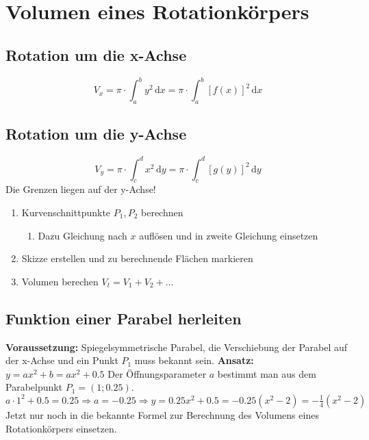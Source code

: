 
\section{Volumen eines Rotationkörpers} %
\label{sec:volumen_eines_rotationkörpers}
\subsection{Rotation um die x-Achse} %
\label{sub:rotation_um_die_x_achse}
\[ V_x = \pi \cdot \int_a^b y^2\,\mathrm{d}x = \pi \cdot \int_a^b [f(x)]^2\,\mathrm{d}x \]
\subsection{Rotation um die y-Achse} %
\label{sub:rotation_um_die_y_achse}
\[ V_y = \pi \cdot \int_c^d x^2\,\mathrm{d}y = \pi \cdot \int_c^d [g(y)]^2\,\mathrm{d}y \]
Die Grenzen liegen auf der y-Achse! 
\begin{enumerate}
	\item Kurvenschnittpunkte \(P_1, P_2\) berechnen
	\begin{enumerate}
		\item Dazu Gleichung nach \(x\) auflösen und in zweite Gleichung einsetzen
	\end{enumerate}
	\item Skizze erstellen und zu berechnende Flächen markieren
	\item Volumen berechen \(V_t = V_1 + V_2 + ... \)
\end{enumerate}
\subsection{Funktion einer Parabel herleiten} %
\label{sub:funktion_einer_parabel_herleiten}
\textbf{Voraussetzung:} Spiegelsymmetrische Parabel, die Verschiebung der Parabel auf der x-Achse und ein Punkt \(P_1\) muss bekannt sein.\newline
\textbf{Ansatz:} \(y = ax^2 + b = ax^2 + 0.5\)\newline
Der Öffnungsparameter \(a\) bestimmt man aus dem Parabelpunkt \(P_1 = (1; 0.25) \).\newline
\( a \cdot 1^2 + 0.5 = 0.25 \Rightarrow a = -0.25 \Rightarrow y = 0.25x^2 + 0.5 = -0.25(x^2-2) = -\frac{1}{4}(x^2 - 2)\)\newline
Jetzt nur noch in die bekannte Formel zur Berechnung des Volumens eines Rotationkörpers einsetzen.
